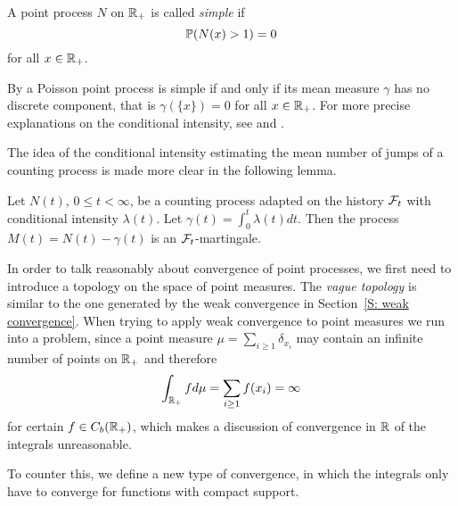 \begin{definition} \label{D: simple point process}
	A point process $N$ on $\mathbb{R}_+$ is called \emph{simple} if 
	\begin{equation}
		\mathbb{P}( N({x}) > 1 ) = 0
	\end{equation}
	for all $x \in \mathbb{R}_+$.
\end{definition}

By \cite[Remark 2.1, p.34]{Haenggi.2013} a Poisson point process is simple if and only if
its mean measure $\gamma$ has no discrete component,
that is $\gamma(\{x\}) = 0$ for all $x \in \mathbb{R}_+$.
For more precise explanations on the conditional intensity, see \cite[p.231ff.]{Daley.2003} and \cite[Chapter 14]{Daley.2008}.

The idea of the conditional intensity estimating the mean number of jumps of a counting process
is made more clear in the following lemma.

\begin{lemma}
	Let $N(t)$, $0 \leq t < \infty$, be a counting process adapted on the history $\mathcal{F}_{t}$
	with conditional intensity $\lambda(t)$.
	Let
	\begin{math}
		\gamma(t) = \int_0^t \lambda(t)dt.
	\end{math}
	Then the process $M(t) = N(t) - \gamma(t)$ is an $\mathcal{F}_{t}$-martingale.
\end{lemma}

\bigskip

In order to talk reasonably about convergence of point processes,
we first need to introduce a topology on the space of point measures.
The \emph{vague topology} is similar to the one generated by the weak convergence in Section~\ref{S: weak convergence}.
When trying to apply weak convergence to point measures we run into a problem,
since a point measure $\mu = \sum_{i \geq 1} \delta_{x_i}$ may contain an infinite number of points on $\mathbb{R}_+$
and therefore
\begin{equation*}
	\int_{\mathbb{R}_+} fd\mu = \sum_{i \geq 1} f(x_i) = \infty
\end{equation*}
for certain $f \in C_b(\mathbb{R}_+)$, which makes a discussion of convergence in $\mathbb{R}$ of the integrals unreasonable.

To counter this, we define a new type of convergence, 
in which the integrals only have to converge for functions with compact support.

